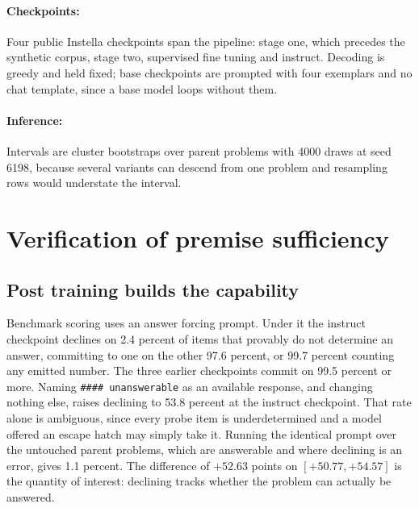 \documentclass{article}
\begin{document}
\paragraph{Checkpoints:} Four public Instella checkpoints span the pipeline: stage one, which
precedes the synthetic corpus, stage two, supervised fine tuning and instruct. Decoding is
greedy and held fixed; base checkpoints are prompted with four exemplars and no chat
template, since a base model loops without them.

\paragraph{Inference:} Intervals are cluster bootstraps over parent problems with 4000 draws
at seed 6198, because several variants can descend from one problem and resampling rows
would understate the interval.

\section{Verification of premise sufficiency}

\subsection{Post training builds the capability}

Benchmark scoring uses an answer forcing prompt. Under it the instruct checkpoint declines on
2.4 percent of items that provably do not determine an answer, committing to one on the other
97.6 percent, or 99.7 percent counting any emitted number. The three earlier checkpoints
commit on 99.5 percent or more. Naming \texttt{\#\#\#\# unanswerable} as
an available response, and changing nothing else, raises declining to 53.8 percent at the
instruct checkpoint. That rate alone is ambiguous, since every probe item is underdetermined
and a model offered an escape hatch may simply take it. Running the identical prompt over the
untouched parent problems, which are answerable and where declining is an error, gives 1.1
percent. The difference of $+52.63$ points on $[+50.77, +54.57]$ is the quantity of interest:
declining tracks whether the problem can actually be answered.
\end{document}
